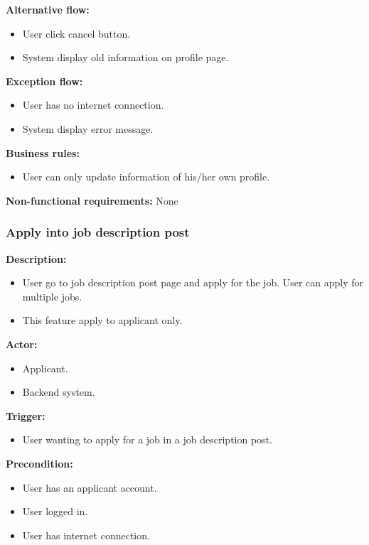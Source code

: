 \documentclass[a4paper]{article}
\begin{document}
        \textbf{Alternative flow:}
        \begin{itemize}
            \item User click cancel button.
            \item System display old information on profile page.
        \end{itemize}

        \textbf{Exception flow:}
        \begin{itemize}
            \item User has no internet connection.
            \item System display error message.
        \end{itemize}

        \textbf{Business rules:}
        \begin{itemize}
            \item User can only update information of his/her own profile.
        \end{itemize}

        \textbf{Non-functional requirements:}
        None

        \subsubsection{Apply into job description post}
        \textbf{Description:}
        \begin{itemize}
            \item User go to job description post page and apply for the job. User can apply for multiple jobs.
            \item This feature apply to applicant only.
        \end{itemize}

        \textbf{Actor:}
        \begin{itemize}
            \item Applicant.
            \item Backend system.
        \end{itemize}

        \textbf{Trigger:}
        \begin{itemize}
            \item User wanting to apply for a job in a job description post.
        \end{itemize}

        \textbf{Precondition:}
        \begin{itemize}
            \item User has an applicant account.
            \item User logged in.
            \item User has internet connection.
        \end{itemize}
\end{document}
